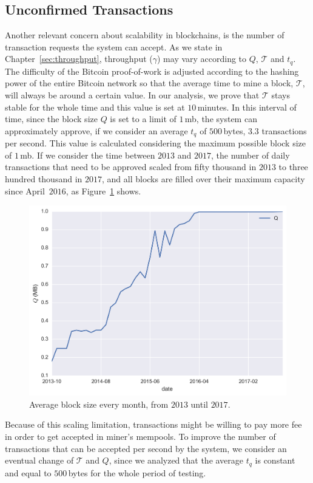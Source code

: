 \documentclass[USenglish]{uit-thesis}
\begin{document}
\subsection{Unconfirmed Transactions}
\label{sec:unconfirmedtxs}
Another relevant concern about scalability in blockchains,
is the number of transaction requests the system
can accept. As we state in Chapter~\ref{sec:throughput},
throughput ($\gamma$) may vary according to $Q$,
$\mathcal{T}$ and $t_q$.
The difficulty of the Bitcoin proof-of-work
is adjusted according to the hashing power of the entire
Bitcoin network so that the average time to mine a block, $\mathcal{T}$,
will always be around a certain value. In our analysis, we prove
that $\mathcal{T}$ stays stable for the whole time and this
value is set at $10$\,minutes. In this interval of time, since
the block size $Q$ is set to a limit of $1$\,\gls{mb}, the system can
approximately approve, if we consider an average $t_q$
of $500$\,bytes, $3.3$ transactions per second. This value is calculated
considering the maximum possible block size of $1$\,\gls{mb}.
If we consider the time between $2013$ and
$2017$, the number of daily transactions that need to be approved
scaled from fifty thousand in $2013$ to three hundred thousand
in $2017$, and all blocks are filled over their maximum
capacity since April~$2016$, as Figure~\ref{fig:block_size} shows.
\begin{figure}[h]
	\centering
	\includegraphics[width=1\textwidth]{img/block_size}
	\caption{Average block size every month, from $2013$ until $2017$.}
	\label{fig:block_size}
\end{figure}
Because of this scaling limitation, transactions might be willing
to pay more fee in order to get accepted in miner's mempools.
To improve the number of transactions that can be
accepted per second by the system, we consider
an eventual change of $\mathcal{T}$ and $Q$, since
we analyzed that the average $t_q$ is constant and equal to
$500$\,bytes for the whole period of testing.
\end{document}
